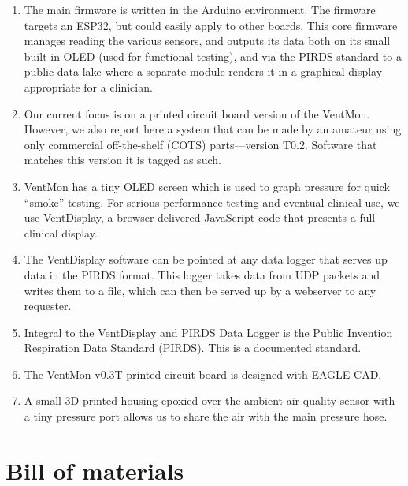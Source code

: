 \documentclass[11pt, letterpaper]{article}
\begin{document}
\begin{enumerate}
\item The main firmware is written in the Arduino environment. The firmware targets an ESP32, but could easily apply to other boards. This core firmware manages reading the various sensors, and outputs its data both on its small built-in OLED (used for functional testing), and via the PIRDS standard to a public data lake where a separate module renders it in a graphical display appropriate for a clinician.
\item Our current focus is on a printed circuit board version of the VentMon\cite{ventmonpcb}. However, we also report here a system that can be made by an amateur using only commercial off-the-shelf (COTS) parts---version T0.2. Software that matches this version it is tagged as such.
\item VentMon has a tiny OLED screen which is used to graph pressure for quick ``smoke'' testing. For serious performance testing and eventual clinical use, we use VentDisplay, a browser-delivered JavaScript code that presents a full clinical display.
\item The VentDisplay software can be pointed at any data logger that serves up data in the PIRDS format. This logger takes data from UDP packets and writes them to a file, which can then be served up by a webserver to any requester.
\item Integral to the VentDisplay and PIRDS Data Logger is the Public Invention Respiration Data Standard (PIRDS). This is a documented standard.
\item The VentMon v0.3T printed circuit board is designed with EAGLE CAD.
\item A small 3D printed housing epoxied over the ambient air quality sensor with a tiny pressure port allows us to share the air with the main pressure hose.
\end{enumerate}



\section{Bill of materials}

\end{document}
